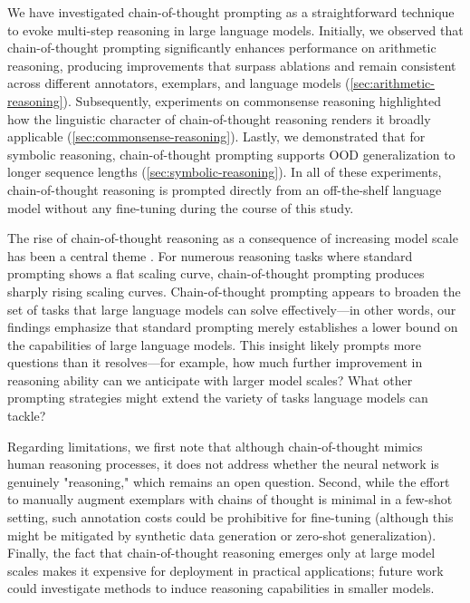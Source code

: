 We have investigated chain-of-thought prompting as a straightforward technique to evoke multi-step reasoning in large language models. Initially, we observed that chain-of-thought prompting significantly enhances performance on arithmetic reasoning, producing improvements that surpass ablations and remain consistent across different annotators, exemplars, and language models (\cref{sec:arithmetic-reasoning}).
Subsequently, experiments on commonsense reasoning highlighted how the linguistic character of chain-of-thought reasoning renders it broadly applicable (\cref{sec:commonsense-reasoning}).
Lastly, we demonstrated that for symbolic reasoning, chain-of-thought prompting supports OOD generalization to longer sequence lengths (\cref{sec:symbolic-reasoning}).
In all of these experiments, chain-of-thought reasoning is prompted directly from an off-the-shelf language model without any fine-tuning during the course of this study.

The rise of chain-of-thought reasoning as a consequence of increasing model scale has been a central theme \citep{wei2022emergent}. For numerous reasoning tasks where standard prompting shows a flat scaling curve, chain-of-thought prompting produces sharply rising scaling curves. Chain-of-thought prompting appears to broaden the set of tasks that large language models can solve effectively—in other words, our findings emphasize that standard prompting merely establishes a lower bound on the capabilities of large language models. This insight likely prompts more questions than it resolves—for example, how much further improvement in reasoning ability can we anticipate with larger model scales? What other prompting strategies might extend the variety of tasks language models can tackle?

Regarding limitations, we first note that although chain-of-thought mimics human reasoning processes, it does not address whether the neural network is genuinely "reasoning," which remains an open question. Second, while the effort to manually augment exemplars with chains of thought is minimal in a few-shot setting, such annotation costs could be prohibitive for fine-tuning (although this might be mitigated by synthetic data generation or zero-shot generalization).
 Finally, the fact that chain-of-thought reasoning emerges only at large model scales makes it expensive for deployment in practical applications; future work could investigate methods to induce reasoning capabilities in smaller models.

